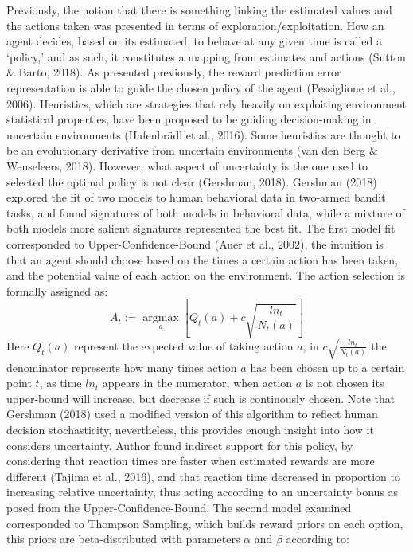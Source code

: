 \documentclass[
]{/home/nicoluarte/Downloads/templates/PNAS-template-main.tex}
\begin{document}
Previously, the notion that there is something linking the estimated
values and the actions taken was presented in terms of
exploration/exploitation. How an agent decides, based on its estimated,
to behave at any given time is called a `policy,' and as such, it
constitutes a mapping from estimates and actions (Sutton \& Barto,
2018). As presented previously, the reward prediction error
representation is able to guide the chosen policy of the agent
(Pessiglione et al., 2006). Heuristics, which are strategies that rely
heavily on exploiting environment statistical properties, have been
proposed to be guiding decision-making in uncertain environments
(Hafenbrädl et al., 2016). Some heuristics are thought to be an
evolutionary derivative from uncertain environments (van den Berg \&
Wenseleers, 2018). However, what aspect of uncertainty is the one used
to selected the optimal policy is not clear (Gershman, 2018). Gershman
(2018) explored the fit of two models to human behavioral data in
two-armed bandit tasks, and found signatures of both models in
behavioral data, while a mixture of both models more salient signatures
represented the best fit. The first model fit corresponded to
Upper-Confidence-Bound (Auer et al., 2002), the intuition is that an
agent should choose based on the times a certain action has been taken,
and the potential value of each action on the environment. The action
selection is formally assigned as:
\[A_t := \underset{a}{\operatorname{argmax}} \left[ Q_t(a) + c \sqrt{ \frac{ln_t}{N_t(a)} } \right] \]
Here \(Q_t(a)\) represent the expected value of taking action \(a\), in
\(c \sqrt{ \frac{ln_t}{N_t(a)} }\) the denominator represents how many
times action \(a\) has been chosen up to a certain point \(t\), as time
\(ln_t\) appears in the numerator, when action \(a\) is not chosen its
upper-bound will increase, but decrease if such is continously chosen.
Note that Gershman (2018) used a modified version of this algorithm to
reflect human decision stochasticity, nevertheless, this provides enough
insight into how it considers uncertainty. Author found indirect support
for this policy, by considering that reaction times are faster when
estimated rewards are more different (Tajima et al., 2016), and that
reaction time decreased in proportion to increasing relative
uncertainty, thus acting according to an uncertainty bonus as posed from
the Upper-Confidence-Bound. The second model examined corresponded to
Thompson Sampling, which builds reward priors on each option, this
priors are beta-distributed with parameters \(\alpha\) and \(\beta\)
according to:
\end{document}
